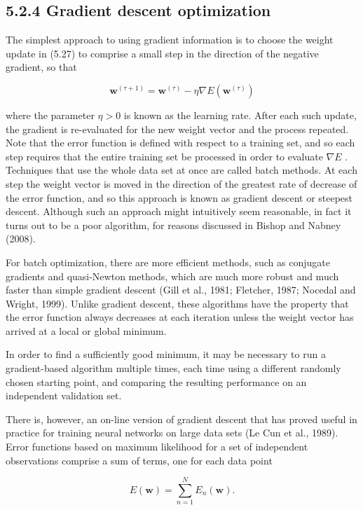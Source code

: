 \documentclass[
  10
]{article}
\begin{document}
\subsection{5.2.4 Gradient descent
optimization}\label{gradient-descent-optimization}

The simplest approach to using gradient information is to choose the
weight update in (5.27) to comprise a small step in the direction of the
negative gradient, so that

\[
\mathbf {w} ^ {(\tau + 1)} = \mathbf {w} ^ {(\tau)} - \eta \nabla E (\mathbf {w} ^ {(\tau)})\tag{5.41}
\]

where the parameter \(\eta > 0\) is known as the learning rate. After
each such update, the gradient is re-evaluated for the new weight vector
and the process repeated. Note that the error function is defined with
respect to a training set, and so each step requires that the entire
training set be processed in order to evaluate \(\nabla E\) . Techniques
that use the whole data set at once are called batch methods. At each
step the weight vector is moved in the direction of the greatest rate of
decrease of the error function, and so this approach is known as
gradient descent or steepest descent. Although such an approach might
intuitively seem reasonable, in fact it turns out to be a poor
algorithm, for reasons discussed in Bishop and Nabney (2008).

For batch optimization, there are more efficient methods, such as
conjugate gradients and quasi-Newton methods, which are much more robust
and much faster than simple gradient descent (Gill et al., 1981;
Fletcher, 1987; Nocedal and Wright, 1999). Unlike gradient descent,
these algorithms have the property that the error function always
decreases at each iteration unless the weight vector has arrived at a
local or global minimum.

In order to find a sufficiently good minimum, it may be necessary to run
a gradient-based algorithm multiple times, each time using a different
randomly chosen starting point, and comparing the resulting performance
on an independent validation set.

There is, however, an on-line version of gradient descent that has
proved useful in practice for training neural networks on large data
sets (Le Cun et al., 1989). Error functions based on maximum likelihood
for a set of independent observations comprise a sum of terms, one for
each data point

\[
E (\mathbf {w}) = \sum_ {n = 1} ^ {N} E _ {n} (\mathbf {w}).\tag{5.42}
\]
\end{document}
